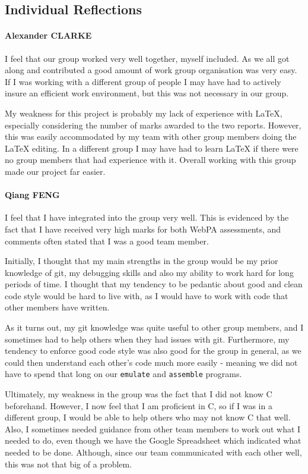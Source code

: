 \documentclass[10pt]{article}
\begin{document}
\subsection{Individual Reflections}

\paragraph{Alexander CLARKE}
I feel that our group worked very well together, myself included. As we all got along and contributed a good amount of work group organisation was very easy. If I was working with a different group of people I may have had to actively insure an efficient work environment, but this was not necessary in our group. 

My weakness for this project is probably my lack of experience with LaTeX, especially considering the number of marks awarded to the two reports. However, this was easily accommodated by my team with other group members doing the LaTeX editing. In a different group I may have had to learn LaTeX if there were no group members that had experience with it. Overall working with this group made our project far easier.

\paragraph{Qiang FENG}
I feel that I have integrated into the group very well. This is evidenced by the fact that I have received very high marks for both WebPA assessments, and comments often stated that I was a good team member.

Initially, I thought that my main strengths in the group would be my prior knowledge of git, my debugging skills and also my ability to work hard for long periods of time. I thought that my tendency to be pedantic about good and clean code style would be hard to live with, as I would have to work with code that other members have written.

As it turns out, my git knowledge was quite useful to other group members, and I sometimes had to help others when they had issues with git. Furthermore, my tendency to enforce good code style was also good for the group in general, as we could then understand each other's code much more easily - meaning we did not have to spend that long on our \texttt{emulate} and \texttt{assemble} programs.

Ultimately, my weakness in the group was the fact that I did not know C beforehand. However, I now feel that I am proficient in C, so if I was in a different group, I would be able to help others who may not know C that well. Also, I sometimes needed guidance from other team members to work out what I needed to do, even though we have the Google Spreadsheet which indicated what needed to be done. Although, since our team communicated with each other well, this was not that big of a problem.
\end{document}
